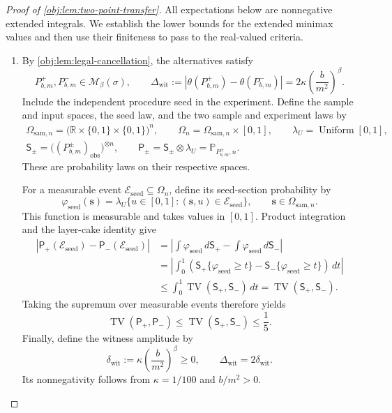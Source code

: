 \begin{proof}[Proof of \cref{obj:lem:two-point-transfer}]
All expectations below are nonnegative extended integrals. We establish the lower bounds for the extended minimax values and then use their finiteness to pass to the real-valued criteria.

\begin{enumerate}
\item
By \cref{obj:lem:legal-cancellation}, the alternatives satisfy
\[
P^+_{b,m},P^-_{b,m}\in\mathcal M_\beta(\sigma),
\qquad
\Delta_{\mathrm{wit}}
:=
\left|\theta(P^+_{b,m})-\theta(P^-_{b,m})\right|
=
2\kappa\left(\frac{b}{m^2}\right)^\beta.
\]
Include the independent procedure seed in the experiment. Define the sample and input spaces, the seed law, and the two sample and experiment laws by
\[
\begin{gathered}
\Omega_{\mathrm{sam},n}
=
\bigl(\mathbb R\times\{0,1\}\times\{0,1\}\bigr)^n,
\qquad
\Omega_n=\Omega_{\mathrm{sam},n}\times[0,1],
\qquad
\lambda_U=\operatorname{Uniform}[0,1],
\\
\mathsf S_\pm
=
\bigl((P^\pm_{b,m})_{\mathrm{obs}}\bigr)^{\otimes n},
\qquad
\mathsf P_\pm
=
\mathsf S_\pm\otimes\lambda_U
=
\mathbb P_{P^\pm_{b,m},n}.
\end{gathered}
\]
These are probability laws on their respective spaces.

For a measurable event \(\mathcal E_{\mathrm{seed}}\subseteq\Omega_n\), define its seed-section probability by
\[
\varphi_{\mathrm{seed}}(\mathbf s)
=
\lambda_U\{u\in[0,1]:(\mathbf s,u)\in\mathcal E_{\mathrm{seed}}\},
\qquad
\mathbf s\in\Omega_{\mathrm{sam},n}.
\]
This function is measurable and takes values in \([0,1]\). Product integration and the layer-cake identity give
\[
\begin{aligned}
\left|
\mathsf P_+(\mathcal E_{\mathrm{seed}})
-
\mathsf P_-(\mathcal E_{\mathrm{seed}})
\right|
&=
\left|
\int\varphi_{\mathrm{seed}}\,d\mathsf S_+
-
\int\varphi_{\mathrm{seed}}\,d\mathsf S_-
\right|
\\
&=
\left|
\int_0^1
\left(
\mathsf S_+\{\varphi_{\mathrm{seed}}\ge t\}
-
\mathsf S_-\{\varphi_{\mathrm{seed}}\ge t\}
\right)\,dt
\right|
\\
&\le
\int_0^1\operatorname{TV}(\mathsf S_+,\mathsf S_-)\,dt
=
\operatorname{TV}(\mathsf S_+,\mathsf S_-).
\end{aligned}
\]
Taking the supremum over measurable events therefore yields
\[
\operatorname{TV}(\mathsf P_+,\mathsf P_-)
\le
\operatorname{TV}(\mathsf S_+,\mathsf S_-)
\le\frac15.
\]
Finally, define the witness amplitude by
\[
\delta_{\mathrm{wit}}
:=
\kappa\left(\frac{b}{m^2}\right)^\beta
\ge0,
\qquad
\Delta_{\mathrm{wit}}=2\delta_{\mathrm{wit}}.
\]
Its nonnegativity follows from \(\kappa=1/100\) and \(b/m^2>0\).


\end{enumerate}
\end{proof}
